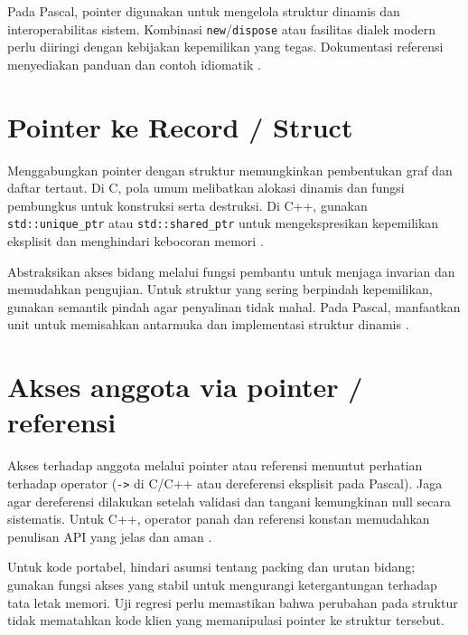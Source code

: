 \documentclass[../main.tex]{subfiles}
\begin{document}
Pada Pascal, pointer digunakan untuk mengelola struktur dinamis dan interoperabilitas sistem. Kombinasi \texttt{new}/\texttt{dispose} atau fasilitas dialek modern perlu diiringi dengan kebijakan kepemilikan yang tegas. Dokumentasi referensi menyediakan panduan dan contoh idiomatik \parencite{free-pascal-docs,gnu-c-manual}.

\section{Pointer ke Record / Struct}
Menggabungkan pointer dengan struktur memungkinkan pembentukan graf dan daftar tertaut. Di C, pola umum melibatkan alokasi dinamis dan fungsi pembungkus untuk konstruksi serta destruksi. Di C++, gunakan \texttt{std::unique\_ptr} atau \texttt{std::shared\_ptr} untuk mengekspresikan kepemilikan eksplisit dan menghindari kebocoran memori \parencite{cpp-reference}.

Abstraksikan akses bidang melalui fungsi pembantu untuk menjaga invarian dan memudahkan pengujian. Untuk struktur yang sering berpindah kepemilikan, gunakan semantik pindah agar penyalinan tidak mahal. Pada Pascal, manfaatkan unit untuk memisahkan antarmuka dan implementasi struktur dinamis \parencite{free-pascal-docs}.

\section{Akses anggota via pointer / referensi}
Akses terhadap anggota melalui pointer atau referensi menuntut perhatian terhadap operator (\texttt{->} di C/C++ atau dereferensi eksplisit pada Pascal). Jaga agar dereferensi dilakukan setelah validasi dan tangani kemungkinan null secara sistematis. Untuk C++, operator panah dan referensi konstan memudahkan penulisan API yang jelas dan aman \parencite{gnu-c-manual,cpp-reference}.

Untuk kode portabel, hindari asumsi tentang packing dan urutan bidang; gunakan fungsi akses yang stabil untuk mengurangi ketergantungan terhadap tata letak memori. Uji regresi perlu memastikan bahwa perubahan pada struktur tidak mematahkan kode klien yang memanipulasi pointer ke struktur tersebut.
\end{document}
